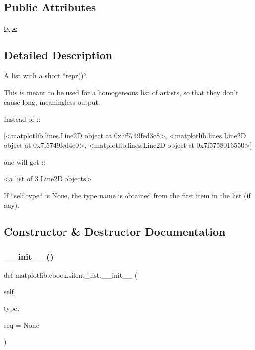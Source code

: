 \subsection*{Public Attributes}
\begin{DoxyCompactItemize}
\item 
\hyperlink{classmatplotlib_1_1cbook_1_1silent__list_afca30ca07f9a02520548a53a8e2cf608}{type}
\end{DoxyCompactItemize}


\subsection{Detailed Description}
\begin{DoxyVerb}A list with a short ``repr()``.

This is meant to be used for a homogeneous list of artists, so that they
don't cause long, meaningless output.

Instead of ::

    [<matplotlib.lines.Line2D object at 0x7f5749fed3c8>,
     <matplotlib.lines.Line2D object at 0x7f5749fed4e0>,
     <matplotlib.lines.Line2D object at 0x7f5758016550>]

one will get ::

    <a list of 3 Line2D objects>

If ``self.type`` is None, the type name is obtained from the first item in
the list (if any).
\end{DoxyVerb}
 

\subsection{Constructor \& Destructor Documentation}
\mbox{\label{classmatplotlib_1_1cbook_1_1silent__list_a79ec2cd1235a82ac33ce743cf00a9800}} 
\subsubsection{\texorpdfstring{\+\_\+\+\_\+init\+\_\+\+\_\+()}{\_\_init\_\_()}}
{\footnotesize\ttfamily def matplotlib.\+cbook.\+silent\+\_\+list.\+\_\+\+\_\+init\+\_\+\+\_\+ (\begin{DoxyParamCaption}\item[{}]{self,  }\item[{}]{type,  }\item[{}]{seq = {\ttfamily None} }\end{DoxyParamCaption})}



